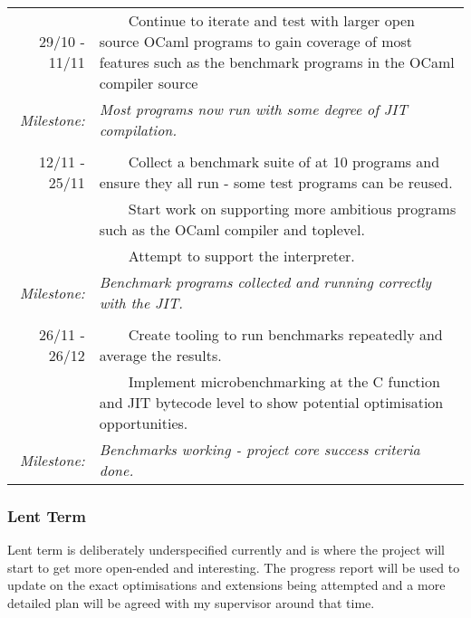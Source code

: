 \documentclass[12pt,a4paper, headings=standardclasses]{scrartcl}
\newcommand{\tabitem}{~~\llap{\textbullet}~~}
\begin{document}
\begin{tabularx}{\textwidth}{rX}
      \\
      29/10 - 11/11
            & \tabitem Continue to iterate and test with larger open source OCaml programs to gain coverage of most features such as
      the benchmark programs in the OCaml compiler source                                                                            \\
      \textit{Milestone:}
            & \textit{Most programs now run with some degree of JIT compilation.}                                                    \\
      \\
      12/11 - 25/11
            & \tabitem Collect a benchmark suite of at 10 programs and ensure they all run - some test programs can be reused.       \\
            & \tabitem Start work on supporting more ambitious programs such as the OCaml compiler and toplevel.                     \\
            & \tabitem Attempt to support the interpreter.                                                                           \\
      \textit{Milestone:}
            & \textit{Benchmark programs collected and running correctly with the JIT.}                                              \\
      \\
      26/11 - 26/12
            & \tabitem Create tooling to run benchmarks repeatedly and average the results.                                          \\
            & \tabitem Implement microbenchmarking at the C function and JIT
      bytecode level to show potential optimisation opportunities.                                                                   \\
      \textit{Milestone:}
            & \textit{Benchmarks working - project core success criteria done.}                                                      \\
      \bottomrule
\end{tabularx}

\subsubsection*{Lent Term}

Lent term is deliberately underspecified currently and is where the project
will start to get more open-ended and interesting. The progress report will be used
to update on the exact optimisations and extensions being attempted and a more detailed
plan will be agreed with my supervisor around that time.
\end{document}
